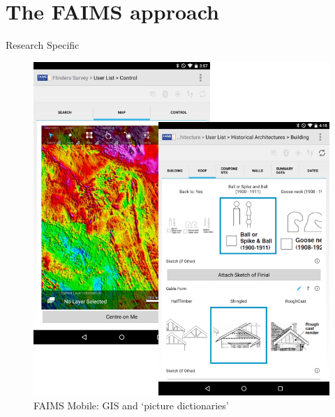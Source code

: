 \documentclass[aspectratio=169, 11pt]{beamer} %
\begin{document}

\section{The FAIMS approach}

\begin{frame}{Research Specific}
 \begin{figure}[H]
    \centering
        \includegraphics[height=.75\textheight]{figures/FAIMS-screenshots.png}
        \caption{FAIMS Mobile: GIS and `picture dictionaries'}
        \label{fig:FAIMS-mobile-screenshots}
 \end{figure}
\end{frame}
\end{document}
